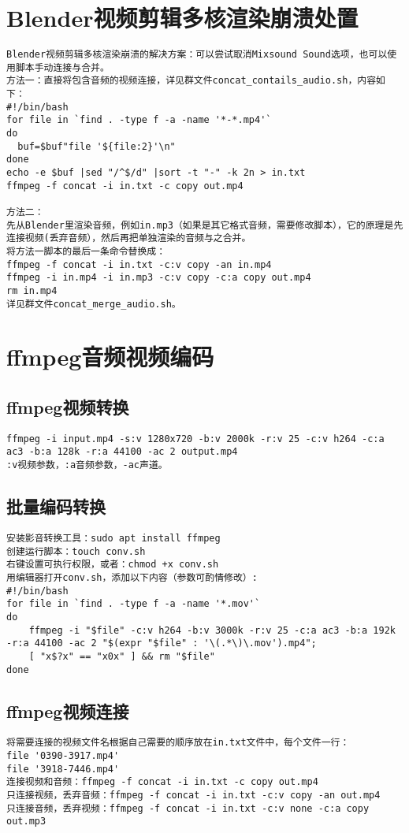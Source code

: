 \documentclass[a4paper,fontset=fandol,zihao=-4,linespread=1.2,oneside]{ctexbook}
\begin{document}
\section{Blender视频剪辑多核渲染崩溃处置}
\begin{lstlisting}
Blender视频剪辑多核渲染崩溃的解决方案：可以尝试取消Mixsound Sound选项，也可以使用脚本手动连接与合并。
方法一：直接将包含音频的视频连接，详见群文件concat_contails_audio.sh，内容如下：
#!/bin/bash
for file in `find . -type f -a -name '*-*.mp4'`
do
  buf=$buf"file '${file:2}'\n"
done
echo -e $buf |sed "/^$/d" |sort -t "-" -k 2n > in.txt
ffmpeg -f concat -i in.txt -c copy out.mp4

方法二：
先从Blender里渲染音频，例如in.mp3（如果是其它格式音频，需要修改脚本），它的原理是先连接视频(丢弃音频），然后再把单独渲染的音频与之合并。
将方法一脚本的最后一条命令替换成：
ffmpeg -f concat -i in.txt -c:v copy -an in.mp4
ffmpeg -i in.mp4 -i in.mp3 -c:v copy -c:a copy out.mp4
rm in.mp4
详见群文件concat_merge_audio.sh。
\end{lstlisting}

\section{ffmpeg音频视频编码}

\subsection{ffmpeg视频转换}
\begin{lstlisting}
ffmpeg -i input.mp4 -s:v 1280x720 -b:v 2000k -r:v 25 -c:v h264 -c:a ac3 -b:a 128k -r:a 44100 -ac 2 output.mp4
:v视频参数，:a音频参数，-ac声道。
\end{lstlisting}

\subsection{批量编码转换}
\begin{lstlisting}
安装影音转换工具：sudo apt install ffmpeg
创建运行脚本：touch conv.sh
右键设置可执行权限，或者：chmod +x conv.sh
用编辑器打开conv.sh，添加以下内容（参数可酌情修改）:
#!/bin/bash
for file in `find . -type f -a -name '*.mov'`
do
    ffmpeg -i "$file" -c:v h264 -b:v 3000k -r:v 25 -c:a ac3 -b:a 192k -r:a 44100 -ac 2 "$(expr "$file" : '\(.*\)\.mov').mp4";
    [ "x$?x" == "x0x" ] && rm "$file"
done
\end{lstlisting}

\subsection{ffmpeg视频连接}
\begin{lstlisting}
将需要连接的视频文件名根据自己需要的顺序放在in.txt文件中，每个文件一行：
file '0390-3917.mp4'
file '3918-7446.mp4'
连接视频和音频：ffmpeg -f concat -i in.txt -c copy out.mp4
只连接视频，丢弃音频：ffmpeg -f concat -i in.txt -c:v copy -an out.mp4
只连接音频，丢弃视频：ffmpeg -f concat -i in.txt -c:v none -c:a copy out.mp3
\end{lstlisting}
\end{document}
